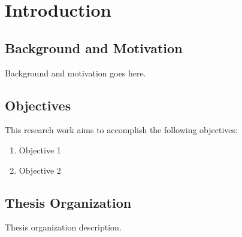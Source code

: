 \chapter{Introduction}
\label{chap:introduction}


\section{Background and Motivation}
Background and motivation goes here.


\section{Objectives}
This research work aims to accomplish the following objectives:
\begin{enumerate}
    \item Objective 1
    \item Objective 2
\end{enumerate}


\section{Thesis Organization}
Thesis organization description.